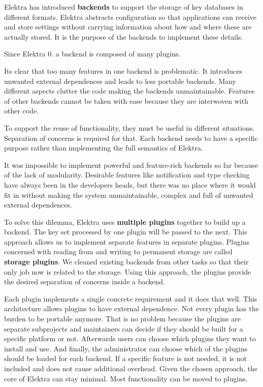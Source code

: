 Elektra has introduced {\bfseries{backends}} to support the storage of key databases in different formats. Elektra abstracts configuration so that applications can receive and store settings without carrying information about how and where these are actually stored. It is the purpose of the backends to implement these details.

Since Elektra 0. a backend is composed of many plugins.

It\textquotesingle{}s clear that too many features in one backend is problematic. It introduces unwanted external dependences and leads to less portable backends. Many different aspects clutter the code making the backends unmaintainable. Features of other backends cannot be taken with ease because they are interwoven with other code.

To support the reuse of functionality, they must be useful in different situations. Separation of concerns is required for that. Each backend needs to have a specific purpose rather than implementing the full semantics of Elektra.

It was impossible to implement powerful and feature-\/rich backends so far because of the lack of modularity. Desirable features like notification and type checking have always been in the developers\textquotesingle{} heads, but there was no place where it would fit in without making the system unmaintainable, complex and full of unwanted external dependences.

To solve this dilemma, Elektra uses {\bfseries{multiple plugins}} together to build up a backend. The key set processed by one plugin will be passed to the next. This approach allows us to implement separate features in separate plugins. Plugins concerned with reading from and writing to permanent storage are called {\bfseries{storage plugins}}. We cleaned existing backends from other tasks so that their only job now is related to the storage. Using this approach, the plugins provide the desired separation of concerns inside a backend.

Each plugin implements a single concrete requirement and it does that well. This architecture allows plugins to have external dependence. Not every plugin has the burden to be portable anymore. That is no problem because the plugins are separate subprojects and maintainers can decide if they should be built for a specific platform or not. Afterwards users can choose which plugins they want to install and use. And finally, the administrator can choose which of the plugins should be loaded for each backend. If a specific feature is not needed, it is not included and does not cause additional overhead. Given the chosen approach, the core of Elektra can stay minimal. Most functionality can be moved to plugins.

